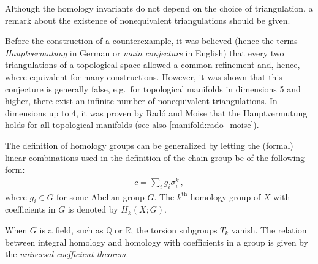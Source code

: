     Although the homology invariants do not depend on the choice of triangulation, a remark about the existence of nonequivalent triangulations should be given.
    \begin{remark}[Hauptvermutung]
        Before the construction of a counterexample, it was believed (hence the terms \textit{Hauptvermutung} in German or \textit{main conjecture} in English) that every two triangulations of a topological space allowed a common refinement and, hence, where equivalent for many constructions. However, it was shown that this conjecture is generally false, e.g.~for topological manifolds in dimensions 5 and higher, there exist an infinite number of nonequivalent triangulations. In dimensions up to 4, it was proven by Rad\'o and Moise that the Hauptvermutung holds for all topological manifolds (see also \cref{manifold:rado_moise}).
    \end{remark}

    \begin{construct}
        The definition of homology groups can be generalized by letting the (formal) linear combinations used in the definition of the chain group be of the following form:
        \begin{gather}
            c = \sum_ig_i\sigma_i^k\,,
        \end{gather}
        where $g_i\in G$ for some Abelian group $G$. The $k^{\text{th}}$ homology group of $X$ with coefficients in $G$ is denoted by $H_k(X;G)$.
    \end{construct}
    \begin{property}
        When $G$ is a field, such as $\mathbb{Q}$ or $\mathbb{R}$, the torsion subgroups $T_k$ vanish. The relation between integral homology and homology with coefficients in a group is given by the \textit{universal coefficient theorem}.
    \end{property}


